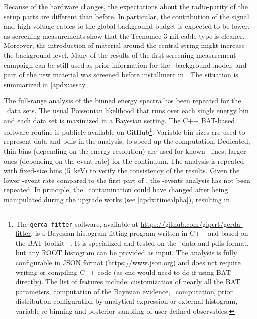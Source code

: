 Because of the hardware changes, the expectations about the radio-purity of
the setup parts are different than before. In particular, the contribution of the signal
and high-voltage cables to the global background budget is expected to be lower, as
screening measurements show that the Tecnomec 3 mil cable type is cleaner. Moreover, the
introduction of material around the central string might increase the background level.
Many of the results of the first screening measurement campaign can be still used as prior
information for the \phasetwop\ background model, and part of the new material was
screened before installment in \gerda. The situation is summarized in \cref{apdx:assay}.

The full-range analysis of the binned energy spectra has been repeated for the \phasetwop\
data sets. The usual Poissonian likelihood that runs over each single energy bin and each
data set is maximized in a Bayesian setting. The C++ BAT-based~\cite{Caldwell2008}
software routine is publicly available on GitHub\footnote{\label{footnote:gerda-fitter}%
  The \texttt{gerda-fitter} software, available at
  \url{https://github.com/gipert/gerda-fitter}, is a Bayesian histogram fitting program
  written in C++ and based on the BAT toolkit \m{v1.0.0}~\cite{Beaujean2018}. It is
  specialized and tested on the \gerda\ data and pdfs format, but any ROOT histogram can
  be provided as input. The analysis is fully configurable in JSON format
  (\url{https://www.json.org}) and does not require writing or compiling C++ code (as one
  would need to do if using BAT directly). The list of features include: customization of
  nearly all the BAT parameters, computation of the Bayesian evidence, \pvalue\
  computation, prior distribution configuration by analytical expression or external
  histogram, variable re-binning and posterior sampling of user-defined observables.
}. Variable bin sizes are used to represent data and pdfs in the analysis, to speed up the
computation. Dedicated, thin bins (depending on the energy resolution) are used for known
\g\ lines; larger ones (depending on the event rate) for the continuum. The analysis is
repeated with fixed-size bins (5~keV) to verify the consistency of the results.
\newpar
Given the lower \a-event rate compared to the first part of \phasetwo, the \a-events
analysis has not been repeated. In principle, the \Po\ contamination could have changed
after being manipulated during the upgrade works (see \cref{apdx:timealpha}), resulting in
